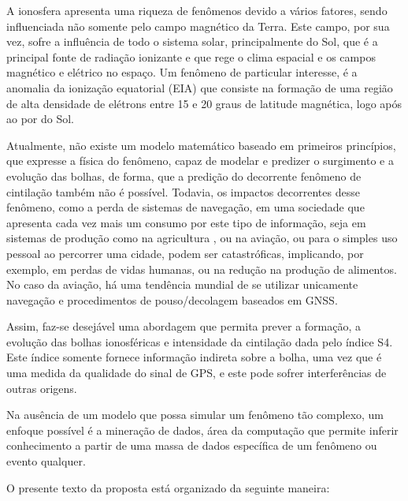 A ionosfera apresenta uma riqueza de fenômenos devido a vários fatores, sendo influenciada não somente pelo campo magnético da Terra. Este campo, por sua vez, sofre a influência de todo o sistema solar, principalmente do Sol, que é a principal fonte de radiação ionizante e que rege o clima espacial e os campos magnético e elétrico no espaço. Um fenômeno de particular interesse, é a anomalia da ionização equatorial (EIA) que consiste na formação de uma região de alta densidade de elétrons entre 15 e 20 graus de latitude magnética, logo após ao por do Sol.

Atualmente, não existe um modelo matemático baseado em primeiros princípios, que expresse a física do fenômeno, capaz de modelar e predizer o surgimento e a evolução das bolhas, de forma, que a predição do decorrente fenômeno de cintilação também não é possível. Todavia, os impactos decorrentes desse fenômeno, como a perda de sistemas de navegação, em uma sociedade que apresenta cada vez mais um consumo por este tipo de informação, seja em sistemas de produção como na agricultura \cite{STAFFORD:2000}, ou na aviação, ou para o simples uso pessoal ao percorrer uma cidade, podem ser catastróficas, implicando, por exemplo, em perdas de vidas humanas, ou na redução na produção de alimentos. No caso da aviação, há uma tendência mundial de se utilizar unicamente navegação e procedimentos de pouso/decolagem baseados em GNSS.

Assim, faz-se desejável uma abordagem que permita prever a formação, a evolução das bolhas ionosféricas e intensidade da cintilação dada pelo índice S4. Este índice somente fornece informação indireta sobre a bolha, uma vez que é uma medida da qualidade do sinal de GPS, e este pode sofrer interferências de outras origens.

Na ausência de um modelo que possa simular um fenômeno tão complexo, um enfoque possível é a mineração de dados, área da computação que permite inferir conhecimento a partir de uma massa de dados específica de um fenômeno ou evento qualquer.

O presente texto da proposta está organizado da seguinte maneira:

